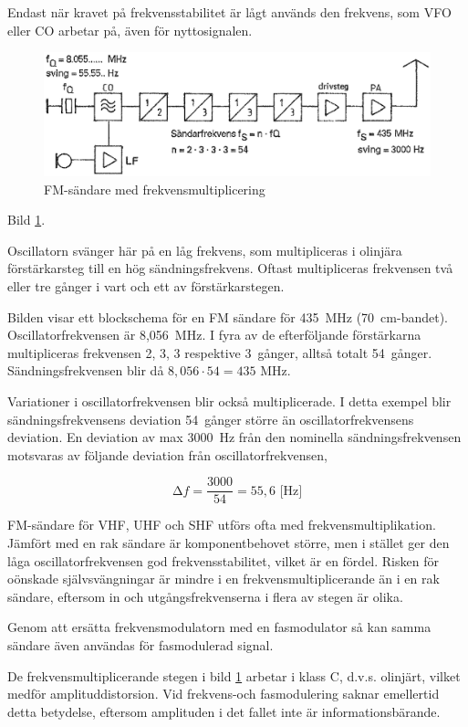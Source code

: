 Endast när kravet på frekvensstabilitet är lågt används den frekvens,
som VFO eller CO arbetar på, även för nyttosignalen.

\begin{figure}
  \includegraphics[width=\textwidth]{images/cropped_pdfs/bild_2_5-03.pdf}
  \caption{FM-sändare med frekvensmultiplicering}
  \label{fig:bildII5-3}
\end{figure}

Bild \ref{fig:bildII5-3}.

Oscillatorn svänger här på en låg frekvens, som multipliceras i
olinjära förstärkarsteg till en hög sändningsfrekvens. Oftast
multipliceras frekvensen två eller tre gånger i vart och ett av
förstärkarstegen.

Bilden visar ett blockschema för en FM sändare för 435~MHz (70~cm-bandet).
Oscillatorfrekvensen är 8,056~MHz.
I fyra av de efterföljande förstärkarna multipliceras frekvensen 2, 3, 3
respektive 3~gånger, alltså totalt 54~gånger. Sändningsfrekvensen blir då
\(8,056 \cdot 54 = 435\) MHz.

Variationer i oscillatorfrekvensen blir också multiplicerade. I detta
exempel blir sändningsfrekvensens deviation 54~gånger större än
oscillatorfrekvensens deviation. En deviation av max 3000~Hz från den
nominella sändningsfrekvensen motsvaras av följande deviation från
oscillatorfrekvensen,

\[∆f = \frac{3000}{54} = 55,6\text{ [Hz]}\]

FM-sändare för VHF, UHF och SHF utförs ofta med
frekvensmultiplikation. Jämfört med en rak sändare är komponentbehovet
större, men i stället ger den låga oscillatorfrekvensen god
frekvensstabilitet, vilket är en fördel. Risken för oönskade
självsvängningar är mindre i en frekvensmultiplicerande än i en rak
sändare, eftersom in och utgångsfrekvenserna i flera av stegen är
olika.

Genom att ersätta frekvensmodulatorn med en fasmodulator så kan samma
sändare även användas för fasmodulerad signal.

De frekvensmultiplicerande stegen i bild \ref{fig:bildII5-3} arbetar i klass C,
d.v.s. olinjärt, vilket medför amplituddistorsion. Vid frekvens-och
fasmodulering saknar emellertid detta betydelse, eftersom amplituden i
det fallet inte är informationsbärande.

